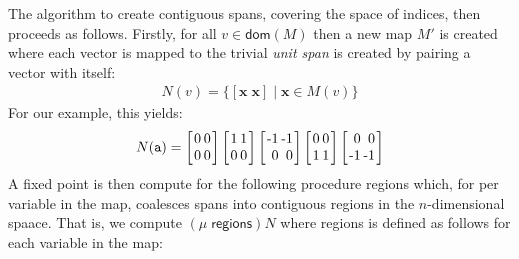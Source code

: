 \documentclass[9pt]{sigplanconf}
\theoremstyle{definition}
\newcommand{\vect}[1]{\textbf{#1}}
\newcommand{\vtwo}[2]{\setlength{\arraycolsep}{0em}
\left[\begin{array}{l}$#1$\\$#2$\end{array}\right]}
\newcommand{\stwo}[4]
{\setlength{\arraycolsep}{0.1em}
\left[\begin{array}{rr}$#1$ & $#3$\\$#2$ & $#4$\end{array}\right]}
\begin{document}
The algorithm to create contiguous spans, covering the space of
indices, then proceeds as follows. 
Firstly, for all $v \in \mathsf{dom}(M)$ then a new map $M'$ is
created where each vector is mapped to the trivial \emph{unit span} is
created by pairing a vector with itself:
%
\begin{align*}
N(v) = \{[\vect{x} \; 
  \vect{x}] \mid \vect{x} \in M(v)\}
\end{align*}
%
For our example, this yields:
\begin{align*}
N(\texttt{a}) = \stwo{0}{0}{0}{0} \stwo{1}{0}{1}{0} \stwo{-1}{0}{-1}{0} \stwo{0}{1}{0}{1} \stwo{0}{-1}{0}{-1}
\end{align*}
A fixed point is then compute for the following
procedure \textsf{regions} which, for per variable
in the map, coalesces spans into contiguous regions in
the $n$-dimensional spaace. That is, we compute
 $(\mu \; \textsf{regions}) N$ where \textsf{regions}
is defined as follows for each variable in the map:
%
\end{document}
